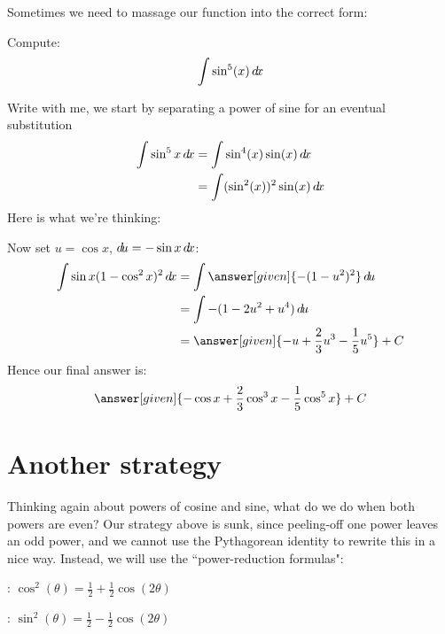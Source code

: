 \documentclass{ximera}
\begin{document}
Sometimes we need to massage our function into the correct form:

\begin{example}
  Compute:
  \[
  \int \sin^5(x) \mathop{}\!d\! x
  \]
  \begin{explanation}
    Write with me, we start by separating a power of sine for an eventual substitution
    \begin{align*}
      \int \sin^5 x\mathop{}\!d\! x &=\int \sin^4(x) \sin(x) \mathop{}\!d\! x\\
      &=\int (\sin^2(x))^2 \sin(x) \mathop{}\!d\! x
    \end{align*}
    Here is what we're thinking:
    \begin{center}%
    \end{center}
    Now set $u=\cos x$, $\mathop{}\!d\! u=-\sin x\mathop{}\!d\! x$:
    \begin{align*}
      \int \sin x (1-\cos^2 x)^2\d x&=\int \answer[given]{-(1-u^2)^2} \d u \\
      &=\int -(1-2u^2+u^4)\d u \\
      &=\answer[given]{-u+\frac{2}{3}u^3-\frac{1}{5}u^5}+C
    \end{align*}
    Hence our final answer is:
    \[
    \answer[given]{-\cos x+\frac{2}{3}\cos^3 x-\frac{1}{5}\cos^5x}+C
    \]
  \end{explanation}
\end{example}

\section{Another strategy}

Thinking again about powers of cosine and sine, what do we do when both powers are even?  Our strategy above is sunk, since peeling-off one power leaves an odd power, and we cannot use the Pythagorean identity to rewrite this in a nice way.  Instead, we will use the ``power-reduction formulas":

\begin{description}
\item[Cosine Power-Reduction]: $\cos^2(\theta)= \frac{1}{2}+\frac{1}{2}\cos(2\theta)$ 
\item[Sine Power-Reduction]: $\sin^2(\theta) = \frac{1}{2}-\frac{1}{2}\cos(2\theta)$
\end{description}
\end{document}
